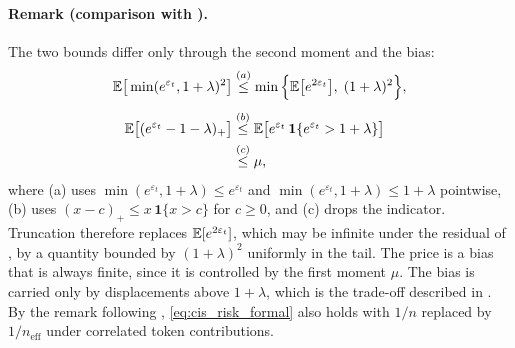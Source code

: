 \paragraph{Remark (comparison with ).}
The two bounds differ only through the second moment and the bias:
\begin{align*}
\mathbb{E}\big[\min(e^{\varepsilon_t},1+\lambda)^2\big]
&\overset{(a)}{\le} \min\Big\{\mathbb{E}\big[e^{2\varepsilon_t}\big],\;(1+\lambda)^2\Big\},\\[4pt]
\mathbb{E}\big[(e^{\varepsilon_t}-1-\lambda)_+\big]
&\overset{(b)}{\le} \mathbb{E}\big[e^{\varepsilon_t}\,\mathbf 1\{e^{\varepsilon_t}>1+\lambda\}\big]\\
&\overset{(c)}{\le} \mu ,
\end{align*}
where (a) uses $\min(e^{\varepsilon_t},1+\lambda)\le e^{\varepsilon_t}$ and
$\min(e^{\varepsilon_t},1+\lambda)\le1+\lambda$ pointwise, (b) uses
$(x-c)_+\le x\,\mathbf 1\{x>c\}$ for $c\ge0$, and (c) drops the indicator.
Truncation therefore replaces $\mathbb{E}[e^{2\varepsilon_t}]$, which may be infinite
under the residual of , by a quantity bounded by
$(1+\lambda)^2$ uniformly in the tail. The price is a bias that is always
finite, since it is controlled by the first moment $\mu$. The bias is carried
only by displacements above $1+\lambda$, which is the trade-off described in
. By the remark following
, \eqref{eq:cis_risk_formal} also holds with $1/n$
replaced by $1/n_{\mathrm{eff}}$ under correlated token contributions.


